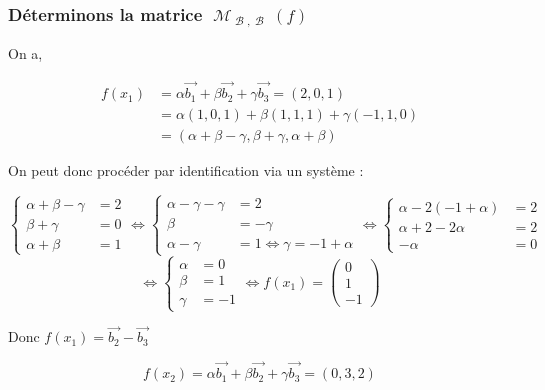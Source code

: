 \documentclass[a4paper,12pt]{article}
\DeclareMathOperator{\M}{\mathcal{M}}
\DeclareMathOperator{\B}{\mathcal{B}}
\begin{document}
\subsubsection{Déterminons la matrice  $\M_{\B,\B}(f)$}

On a,

\begin{align*}
    f(x_1)&=\alpha\vec{b_1}+\beta\vec{b_2}+\gamma\vec{b_3}=(2,0,1) \\
    &=\alpha(1,0,1)+\beta(1,1,1)+\gamma(-1,1,0) \\
    &=(\alpha+\beta-\gamma,\beta+\gamma,\alpha+\beta)
\end{align*}

On peut donc procéder par identification via un système :

$$
    \left\{\begin{array}{rl}
        \alpha+\beta-\gamma &=2 \\
        \beta+\gamma &= 0 \\
        \alpha+\beta&=1
    \end{array} \right.
    \Leftrightarrow
    \left\{\begin{array}{rl}
        \alpha-\gamma-\gamma &=2 \\
        \beta &= -\gamma \\
        \alpha-\gamma &= 1 \Leftrightarrow \gamma=-1+\alpha
    \end{array} \right.
    \Leftrightarrow
    \left\{\begin{array}{rl}
        \alpha-2(-1+\alpha)&=2 \\
        \alpha+2-2\alpha&=2 \\
        -\alpha&=0
    \end{array}\right.
$$
$$
    \Leftrightarrow
    \left\{\begin{array}{rl}
        \alpha&=0 \\
        \beta&=1 \\
        \gamma&=-1
    \end{array}\right.
    \Leftrightarrow
    f(x_1)=\begin{pmatrix}0\\1\\-1\end{pmatrix}
$$

Donc $f(x_1)=\vec{b_2}-\vec{b_3}$
\clearpage

$$f(x_2)=\alpha\vec{b_1}+\beta\vec{b_2}+\gamma\vec{b_3}=(0,3,2)$$
\end{document}
